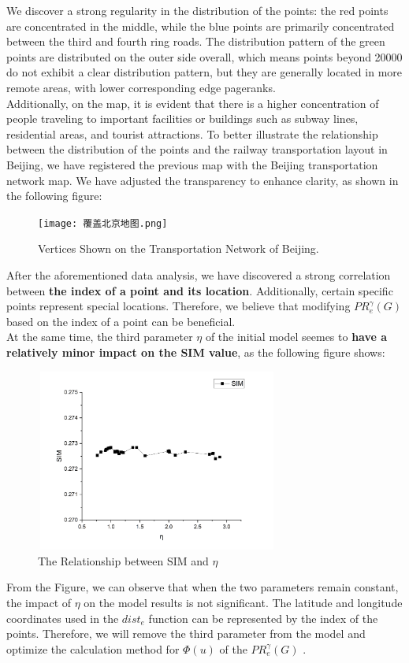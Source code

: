\indent We discover a strong regularity in the distribution of the points: the red points are concentrated in the middle, while the blue points are primarily concentrated between the third and fourth ring roads. The distribution pattern of the green points are distributed on the outer side overall, which means points beyond 20000 do not exhibit a clear distribution pattern, but they are generally located in more remote areas, with lower corresponding edge pageranks.\\
\indent Additionally, on the map, it is evident that there is a higher concentration of people traveling to important facilities or buildings such as subway lines, residential areas, and tourist attractions. To better illustrate the relationship between the distribution of the points and the railway transportation layout in Beijing, we have registered the previous map with the Beijing transportation network map. We have adjusted the transparency to enhance clarity, as shown in the following figure:
\begin{figure}[H]%
    \centering
    \texttt{[image: 覆盖北京地图.png]}
    \caption{Vertices Shown on the Transportation Network of Beijing.}
\end{figure}

\indent After the aforementioned data analysis, we have discovered a strong correlation between \textbf{the index of a point and its location}. Additionally, certain specific points represent special locations. Therefore, we believe that modifying $PR^{\gamma}_e(G)$ based on the index of a point can be beneficial.\\
\indent At the same time, the third parameter $\eta$ of the initial model seemes to \textbf{have a relatively minor impact on the SIM value}, as the following figure shows:
\begin{figure}[H]%
    \centering
    \includegraphics[width=8cm,height=6cm]{SIM-c.png}
    \caption{The Relationship between SIM and $\eta$}  
\end{figure}
\indent From the Figure, we can observe that when the two parameters remain constant, the impact of $\eta$ on the model results is not significant. The latitude and longitude coordinates used in the $dist_e$ function can be represented by the index of the points. Therefore, we will remove the third parameter from the model and optimize the calculation method for $\Phi(u)$ of the $PR^{\gamma}_e(G)$ .

